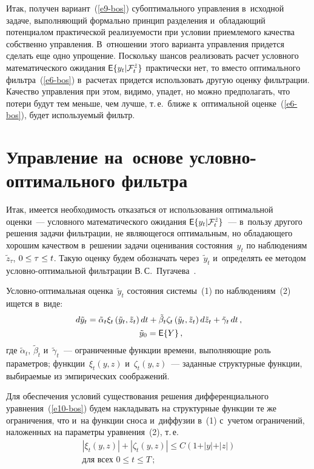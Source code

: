 \begin{multicols}{2}
     Итак, получен вариант~(\ref{e9-bos}) субоптимального управления 
в~исходной задаче, выполняющий формально принцип разделения 
и~обладающий потенциалом практической реализуемости при условии 
приемлемого качества собственно управления. В~отношении этого варианта 
управления придется сделать еще одно упрощение. Поскольку шансов 
реализовать расчет условного математического ожидания ${\sf E}\{ y_t\vert 
\mathcal{F}_t^{\tilde{z}}\}$ практически нет, то вместо оптимального 
фильтра~(\ref{e6-bos}) в~расчетах придется использовать другую оценку 
фильтрации. Качество управления при этом, видимо, упадет, но можно 
предполагать, что потери будут тем меньше, чем лучше, т.\,е.\ ближе 
к~оптимальной оценке~(\ref{e6-bos}), будет используемый фильтр.

\section{Управление на~основе условно-оптимального фильтра}
     
     Итак, имеется необходимость отказаться от использования 
оптимальной оценки~--- условного математического ожидания ${\sf E}\{ y_t\vert 
\mathcal{F}_t^{\tilde{z}}\}$~--- в~пользу другого решения задачи 
фильтрации, не являющегося оптимальным, но обладающего хорошим 
качеством в~решении задачи оценивания состояния~$y_t$ по 
наблюдениям~$\tilde{z}_\tau$, $0\hm\leq \tau\hm\leq t$. Такую оценку будем 
обозначать через~$\tilde{y}_t$ и~определять ее методом 
услов\-но-оп\-ти\-маль\-ной фильтрации В.\,С.~Пугачева~\cite{8-bos}.
     
     Условно-оптимальная оценка~$\tilde{y}_t$ состояния сис\-те\-мы~(1) по 
наблюдениям~(2) ищется в~виде:
     \begin{multline}
     d\tilde{y}_t=\tilde{\alpha}_t\xi_t\left( 
\tilde{y}_t,\tilde{z}_t\right)dt+\tilde{\beta}_t\zeta_t\left( 
\tilde{y}_t,\tilde{z}_t\right)d\tilde{z}_t+\tilde{\gamma}_t\,dt\,,\\[1pt]
\enskip 
\tilde{y}_0={\sf E}\{Y\}\,,
     \label{e10-bos}
     \end{multline}
где $\tilde{\alpha}_t$, $\tilde{\beta}_t$ и~$\tilde{\gamma}_t$~--- ограниченные 
функции времени, выполняющие роль параметров; функции~$\xi_t(y,z)$ 
и~$\zeta_t(y,z)$~--- заданные структурные функции, выбираемые из 
эмпирических соображений.

     Для обеспечения условий существования решения дифференциального 
уравнения~(\ref{e10-bos}) будем накладывать на структурные функции те же 
ограничения, что и~на функции сноса и~диффузии в~(1) с~учетом 
ограничений, наложенных на параметры уравнения~(2), т.\,е.
\begin{multline*}
\left\vert \xi_t(y,z)\right\vert + \left\vert \zeta_t(y,z)\right\vert 
\leq C(1+\vert y\vert +\vert z\vert )\\[1pt] \mbox{для\ всех } 0\leq t\leq T\,;
\end{multline*}


\end{multicols}
